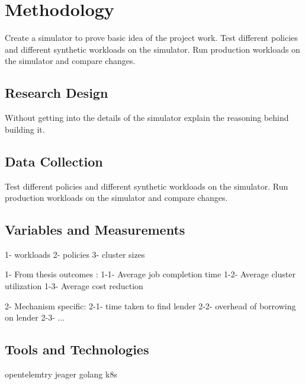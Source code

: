 \section{Methodology}

Create a simulator to prove basic idea of the project work. Test different policies and different synthetic
workloads on the simulator. Run production workloads on the simulator and compare changes.

\subsection{Research Design}
Without getting into the details of the simulator explain the reasoning behind building it.
\subsection{Data Collection}
Test different policies and different synthetic workloads on the simulator. 
Run production workloads on the simulator and compare changes.

\subsection{Variables and Measurements}
1- workloads %
2- policies 
3- cluster sizes

1- From thesis outcomes :
    1-1- Average job completion time
    1-2- Average cluster utilization
    1-3- Average cost reduction

2- Mechanism specific: 
   2-1- time taken to find lender
   2-2- overhead of borrowing on lender
   2-3- ... 
\subsection{Tools and Technologies}
opentelemtry
jeager
golang
k8s